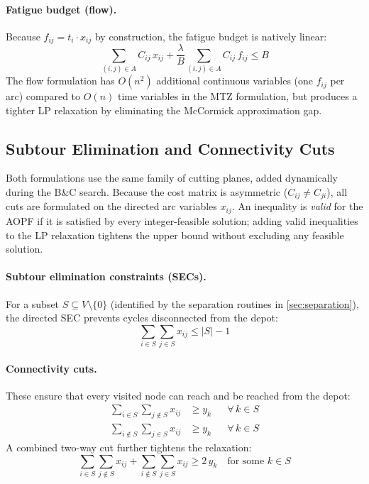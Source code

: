 \documentclass[preprint,11pt]{elsarticle}
\begin{document}
\paragraph{Fatigue budget (flow).}
Because $f_{ij} = t_i \cdot x_{ij}$ by construction, the fatigue budget is natively linear:
\begin{equation}
  \sum_{(i,j) \in A} C_{ij} \, x_{ij} + \frac{\lambda}{B} \sum_{(i,j) \in A} C_{ij} \, f_{ij} \leq B
  \label{eq:fatigue_budget_flow}
\end{equation}
The flow formulation has $O(n^2)$ additional continuous variables (one $f_{ij}$ per arc) compared to $O(n)$ time variables in the MTZ formulation, but produces a tighter LP relaxation by eliminating the McCormick approximation gap.

\subsection{Subtour Elimination and Connectivity Cuts}

Both formulations use the same family of cutting planes, added dynamically during the B\&C search.
Because the cost matrix is asymmetric ($C_{ij} \neq C_{ji}$), all cuts are formulated on the directed arc variables $x_{ij}$.
An inequality is \emph{valid} for the AOPF if it is satisfied by every integer-feasible solution; adding valid inequalities to the LP relaxation tightens the upper bound without excluding any feasible solution.

\paragraph{Subtour elimination constraints (SECs).}
For a subset $S \subseteq V \setminus \{0\}$ (identified by the separation routines in \cref{sec:separation}), the directed SEC prevents cycles disconnected from the depot:
\begin{equation}
  \sum_{i \in S} \sum_{j \in S} x_{ij} \leq |S| - 1
  \label{eq:sec}
\end{equation}

\paragraph{Connectivity cuts.}
These ensure that every visited node can reach and be reached from the depot:
\begin{align}
  \sum_{i \in S} \sum_{j \notin S} x_{ij} &\geq y_k && \forall\, k \in S \label{eq:outcut} \\
  \sum_{i \notin S} \sum_{j \in S} x_{ij} &\geq y_k && \forall\, k \in S \label{eq:incut}
\end{align}
A combined two-way cut further tightens the relaxation:
\begin{equation}
  \sum_{i \in S} \sum_{j \notin S} x_{ij} + \sum_{i \notin S} \sum_{j \in S} x_{ij} \geq 2\, y_k \quad \text{for some } k \in S
  \label{eq:twocut}
\end{equation}
\end{document}
